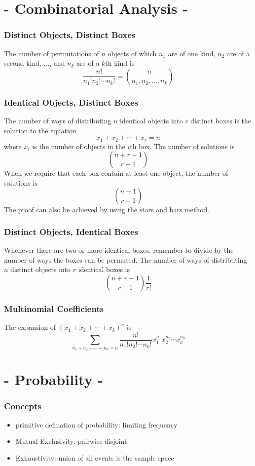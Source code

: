 \documentclass[a4paper,12pt]{article}
\begin{document}
\begin{multicols}{2}
\section*{- Combinatorial Analysis -}

\setlength{\columnseprule}{0.4pt}
\subsubsection*{Distinct Objects, Distinct Boxes}
The number of permutations of $n$ objects of which $n_1$ are of one kind, $n_2$ are of a second kind, $\ldots$, and $n_k$ are of a $k$th kind is
\[
\frac{n!}{n_1!n_2!\cdots n_k!} = \binom{n}{n_1,n_2,\ldots,n_k}
\]

\subsubsection*{Identical Objects, Distinct Boxes}
The number of ways of distributing $n$ identical objects into $r$ distinct boxes is the solution to the equation
\[
x_1 + x_2 + \cdots + x_r = n
\]
where $x_i$ is the number of objects in the $i$th box. The number of solutions is
\[
\binom{n+r-1}{r-1}
\]
When we require that each box contain at least one object, the number of solutions is
\[
\binom{n-1}{r-1}
\]
The proof can also be achieved by using the stars and bars method.

\subsubsection*{Distinct Objects, Identical Boxes}
Whenever there are two or more identical boxes, remember to divide by the number of ways the boxes can be permuted. The number of ways of distributing $n$ distinct objects into $r$ identical boxes is
\[
\binom{n+r-1}{r-1}\frac{1}{r!}
\]

\subsubsection*{Multinomial Coefficients}
The expansion of $(x_1 + x_2 + \cdots + x_k)^n$ is
\[
\sum_{n_1 + n_2 + \cdots + n_k = n} \frac{n!}{n_1!n_2!\cdots n_k!}x_1^{n_1}x_2^{n_2}\cdots x_k^{n_k}
\]
\newcolumn

\section*{- Probability -}
\subsubsection*{Concepts}
\begin{itemize}
    \item primitive defination of probability: limiting frequency
    \item Mutual Exclusivity: pairwise disjoint
    \item Exhaustivity: union of all events is the sample space
\end{itemize}

\end{multicols}
\end{document}
